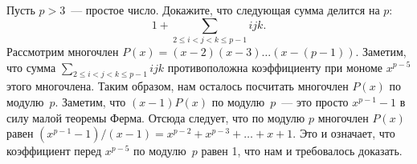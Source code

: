 \problem{}
Пусть $p > 3$~--- простое число.
Докажите, что следующая сумма делится на $p$:
\[
    1 +
    \sum_{2 \leq i < j < k \leq p-1}
        i j k
.\]
\solution
Рассмотрим многочлен $P(x) = (x - 2) (x - 3) \ldots (x - (p - 1))$.
Заметим, что сумма
\(
    \sum_{2 \leq i < j < k \leq p-1}
        i j k
\)
противоположна коэффициенту при мономе $x^{p-5}$ этого многочлена.
Таким образом, нам осталось посчитать многочлен $P(x)$ по модулю~$p$.
Заметим, что $(x - 1) P(x)$ по модулю~$p$~--- это просто $x^{p-1} - 1$ в силу
малой теоремы Ферма.
Отсюда следует, что по модулю $p$ многочлен $P(x)$ равен
$(x^{p-1} - 1)/(x - 1) = x^{p-2} + x^{p-3} + \ldots + x + 1$.
Это и означает, что коэффициент перед $x^{p-5}$ по модулю~$p$ равен 1, что нам
и требовалось доказать.
\endproblem
